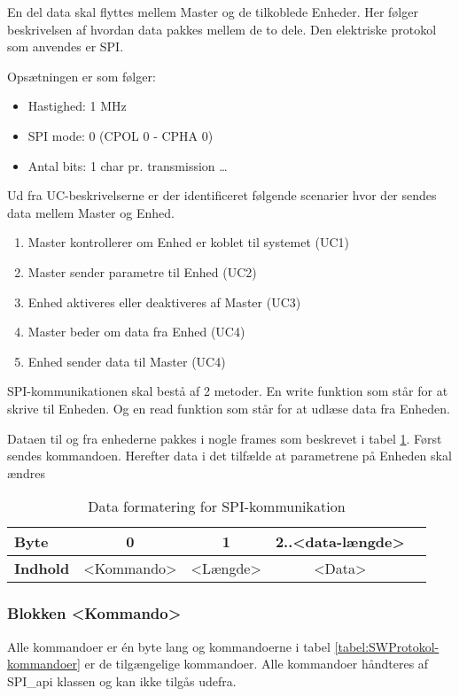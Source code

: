 
En del data skal flyttes mellem Master og de tilkoblede Enheder. Her følger beskrivelsen af hvordan data pakkes mellem de to dele. Den elektriske protokol som anvendes er SPI.

Opsætningen er som følger:

\begin{itemize}
  \item Hastighed: 1 MHz
  \item SPI mode: 0 (CPOL 0 - CPHA 0)
  \item Antal bits: 1 char pr. transmission \ldots
\end{itemize}

Ud fra UC-beskrivelserne er der identificeret følgende scenarier hvor der sendes data mellem Master og Enhed.

\begin{enumerate}
	\item Master kontrollerer om Enhed er koblet til systemet (UC1)
	\item Master sender parametre til Enhed (UC2)
	\item Enhed aktiveres eller deaktiveres af Master (UC3)
	\item Master beder om data fra Enhed (UC4)
	\item Enhed sender data til Master (UC4)
\end{enumerate}

SPI-kommunikationen skal bestå af 2 metoder. En write funktion som står for at skrive til Enheden. Og en read funktion som står for at udlæse data fra Enheden.

Dataen til og fra enhederne pakkes i nogle frames som beskrevet i tabel \ref{table:SWProtokol-frames}. Først sendes kommandoen. Herefter data i det tilfælde at parametrene på Enheden skal ændres

\begin{table}[h]
	\caption{Data formatering for SPI-kommunikation}
	\centering
	\begin{tabular}{|l|c|c|c|c|}
		\hline 
		\textbf{Byte} & 0 & 1 & 2..<data-længde>  \\ 
		\hline 
		\textbf{Indhold} & <Kommando> & <Længde> & <Data>  \\ 
		\hline 
	\end{tabular} 
	\label{table:SWProtokol-frames}
\end{table}

\subsubsection*{Blokken <Kommando>}
Alle kommandoer er én byte lang og kommandoerne i tabel \ref{tabel:SWProtokol-kommandoer} er de tilgængelige kommandoer. Alle kommandoer håndteres af SPI\_api klassen og kan ikke tilgås udefra.

